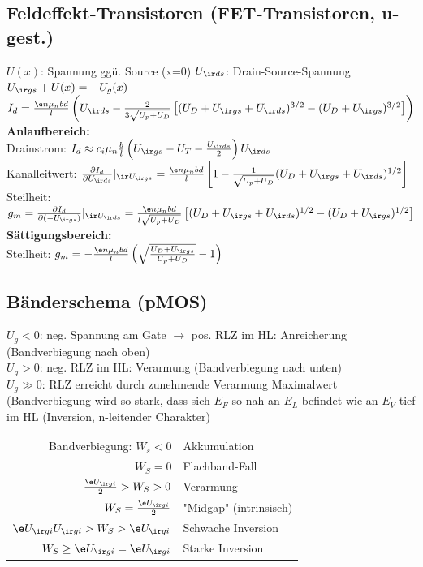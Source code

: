 \documentclass[fs, footer]{latex4ei}
\begin{document}
\begin{multicols*}{4}
\section{Feldeffekt-Transistoren (FET-Transistoren, u-gest.)}
$U(x)$: Spannung ggü. Source (x=0) \quad $U_{\ir ds}$: Drain-Source-Spannung\\
$U_{\ir gs} + U(x) = - U_g(x)$\\
$I_d = \frac{\e n\mu_nbd}{l}\left(U_{\ir ds}-\frac{2}{3\sqrt{U_p+U_D}}\left[(U_D+U_{\ir gs}+U_{\ir ds})^{3/2}-(U_D+U_{\ir gs})^{3/2}\right]\right)$\\
\textbf{Anlaufbereich:}\\
Drainstrom: $I_d \approx c_i\mu_n\frac{b}{l}\left(U_{\ir gs}-U_T-\frac{U_{\ir ds}}{2}\right)U_{\ir ds}$\\
Kanalleitwert: $\frac{\partial I_d}{\partial U_{\ir ds}}|_{\ir U_{\ir gs}} = \frac{\e n\mu_nbd}{l}\left[1-\frac{1}{\sqrt{U_p+U_D}}(U_D+U_{\ir gs}+U_{\ir ds})^{1/2}\right]$\\
Steilheit: $g_m =\frac{\partial I_d}{\partial (-U_{\ir gs})}|_{\ir U_{\ir ds}} =  \frac{\e n\mu_nbd}{l\sqrt{U_p+U_D}}\left[(U_D+U_{\ir gs}+U_{\ir ds})^{1/2}-(U_D+U_{\ir gs})^{1/2}\right]$\\
\textbf{Sättigungsbereich:}\\
Steilheit: $g_m = -\frac{\e n\mu_nbd}{l}\left(\sqrt{\frac{U_D+U_{\ir gs}}{U_p+U_D}}-1\right)$
\subsection{Bänderschema (pMOS)}
$U_g<0$: neg. Spannung am Gate $\rightarrow$ pos. RLZ im HL: Anreicherung (Bandverbiegung nach oben)\\
$U_g>0$: neg. RLZ im HL: Verarmung (Bandverbiegung nach unten)\\
$U_g\gg 0$: RLZ erreicht durch zunehmende Verarmung Maximalwert (Bandverbiegung wird so stark, dass sich $E_F$ so nah an $E_L$ befindet wie an $E_V$ tief im HL (Inversion, n-leitender Charakter)\\
\begin{tabular}{r|l}
Bandverbiegung: $W_s<0$ & Akkumulation\\
$W_S=0$ & Flachband-Fall\\
$\frac{\e U_{\ir gi}}{2}>W_S>0$ & Verarmung\\
$W_S=\frac{\e U_{\ir gi}}{2}$ & "Midgap" (intrinsisch)\\
$\e U_{\ir gi}U_{\ir gi}>W_S>\e U_{\ir gi}$ & Schwache Inversion\\
$W_S\geq \e U_{\ir gi}=\e U_{\ir gi}$ & Starke Inversion\\
\end{tabular}

\end{multicols*}
\end{document}
